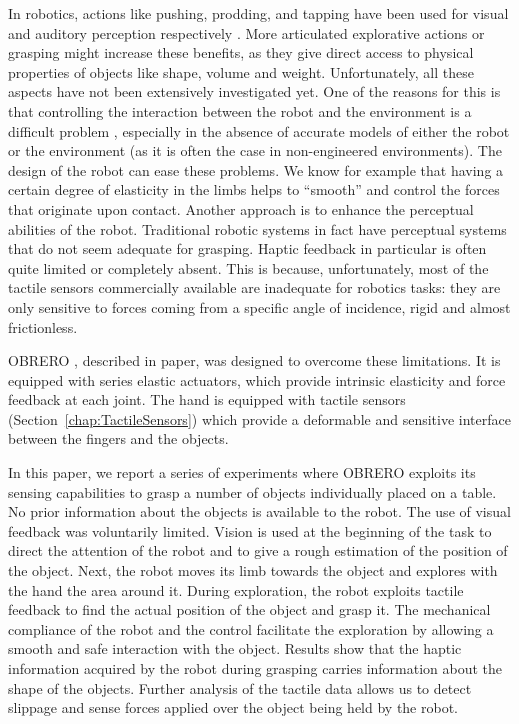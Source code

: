 In robotics, actions like pushing, prodding, and tapping have been
used for visual and auditory perception respectively
\cite{metta03early,etorresjara05tapping}. More articulated
explorative actions or grasping might increase these benefits, as
they give direct access to physical properties of objects like
shape, volume and weight.
%
Unfortunately, all these aspects have not been extensively
investigated yet. One of the reasons for this is that controlling
the interaction between the robot and the environment is a
difficult problem \cite{volpe90real}, especially in the absence of
accurate models of either the robot or the environment (as it is
often the case in non-engineered environments).
%
The design of the robot can ease these problems. We know for
example that having a certain degree of elasticity in the limbs
helps to ``smooth''  and control the forces that originate upon
contact. Another approach is to enhance the perceptual abilities
of the robot. Traditional robotic systems in fact have perceptual
systems that do not seem adequate for grasping. Haptic feedback in
particular is often quite limited or completely absent. This is
because, unfortunately, most of the tactile sensors commercially
available are inadequate for robotics tasks: they are only
sensitive to forces coming from a specific angle of incidence,
rigid and almost frictionless.

OBRERO \cite{obrero}, described in paper, was designed to overcome
these limitations. It is equipped with series elastic actuators,
which provide intrinsic elasticity and force feedback at each
joint. The hand is equipped with tactile sensors
(Section~\ref{chap:TactileSensors}) which provide a deformable and
sensitive interface between the fingers and the objects.

In this paper, we report a series of experiments where OBRERO
exploits its sensing capabilities to grasp a number of objects
individually placed on a table. No prior information about the
objects is available to the robot. The use of visual feedback was
voluntarily limited. Vision is used at the beginning of the task
to direct the attention of the robot and to give a rough
estimation of the position of the object. Next, the robot moves
its limb towards the object and explores with the hand the area
around it. During exploration, the robot exploits tactile feedback
to find the actual position of the object and grasp it. The
mechanical compliance of the robot and the control facilitate the
exploration by allowing a smooth and safe interaction with the
object. Results show that the haptic information acquired by the
robot during grasping carries information about the shape of the
objects. Further analysis of the tactile data allows us to detect
slippage and sense forces applied over the object being held by
the robot.

